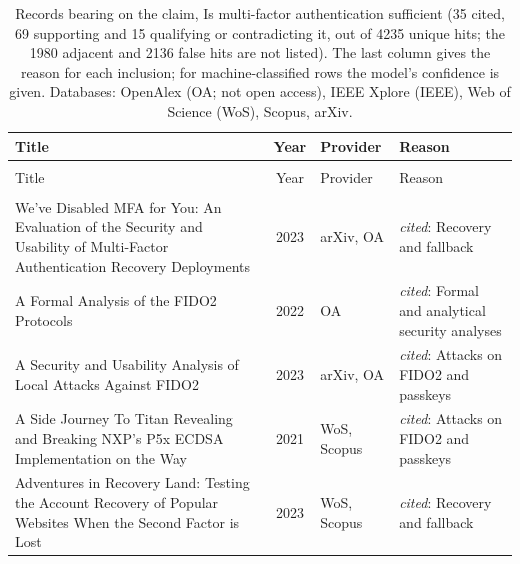 
\begingroup\footnotesize
\begin{longtable}{@{}%
  >{\raggedright\arraybackslash}p{}c%
  >{\raggedright\arraybackslash}p{}%
  >{\raggedright\arraybackslash}p{}@{}}
\caption{Records bearing on the claim, Is multi-factor authentication sufficient (35 cited, 69 supporting and 15 qualifying or contradicting it, out of 4235 unique hits; the 1980 adjacent and 2136 false hits are not listed). The last column gives the reason for each inclusion; for machine-classified rows the model's confidence is given. Databases: OpenAlex (OA; not open access), IEEE Xplore (IEEE), Web of Science (WoS), Scopus, arXiv.}\label{tab:hits-sufficient}\\
\toprule
Title & Year & Provider & Reason \\
\midrule
\endfirsthead
\multicolumn{4}{@{}l}{\emph{\tablename~\thetable{} (cont.)}}\\
\toprule
Title & Year & Provider & Reason \\
\midrule
\endhead
\midrule \multicolumn{4}{r@{}}{\emph{continued on next page}}\\
\endfoot
\bottomrule
\endlastfoot
\textquotedbl{}We've Disabled MFA for You\textquotedbl{}: An Evaluation of the Security and Usability of Multi-Factor Authentication Recovery Deployments & 2023 & arXiv, OA & \emph{cited}: Recovery and fallback \\
A Formal Analysis of the FIDO2 Protocols & 2022 & OA & \emph{cited}: Formal and analytical security analyses \\
A Security and Usability Analysis of Local Attacks Against FIDO2 & 2023 & arXiv, OA & \emph{cited}: Attacks on FIDO2 and passkeys \\
A Side Journey To Titan Revealing and Breaking NXP's P5x ECDSA Implementation on the Way & 2021 & WoS, Scopus & \emph{cited}: Attacks on FIDO2 and passkeys \\
Adventures in Recovery Land: Testing the Account Recovery of Popular Websites When the Second Factor is Lost & 2023 & WoS, Scopus & \emph{cited}: Recovery and fallback \\

\end{longtable}
